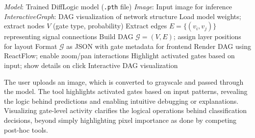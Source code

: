 \begin{algorithm}[H]
\caption{DiffLogicVisualizer Workflow}
\label{alg:difflogicvisualizer}
\begin{algorithmbox}
\begin{algorithmic}[1]
\Require \textit{Model}: Trained DiffLogic model (\texttt{.pth} file)
\Require \textit{Image}: Input image for inference
\Ensure \textit{InteractiveGraph}: DAG visualization of network structure
\State Load model weights; extract nodes $V$ (gate type, probability)
\State Extract edges $E = \{(v_i, v_j)\}$ representing signal connections
\State Build DAG $\mathcal{G} = (V, E)$; assign layer positions for layout
\State Format $\mathcal{G}$ as JSON with gate metadata for frontend
\State Render DAG using ReactFlow; enable zoom/pan interactions
\State Highlight activated gates based on input; show details on click
\State \Return Interactive DAG visualization
\end{algorithmic}
\end{algorithmbox}
\end{algorithm}


The user uploads an image, which is converted to grayscale and passed through the model. The tool highlights activated gates based on input patterns, revealing the logic behind predictions and enabling intuitive debugging or explanations. Visualizing gate-level activity clarifies the logical operations behind classification decisions, beyond simply highlighting pixel importance as done by competing post-hoc tools.
